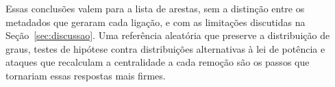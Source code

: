 Essas conclusões valem para a lista de arestas, sem a distinção entre os metadados que geraram cada ligação, e com as limitações discutidas na Seção~\ref{sec:discussao}. Uma referência aleatória que preserve a distribuição de graus, testes de hipótese contra distribuições alternativas à lei de potência e ataques que recalculam a centralidade a cada remoção são os passos que tornariam essas respostas mais firmes.
